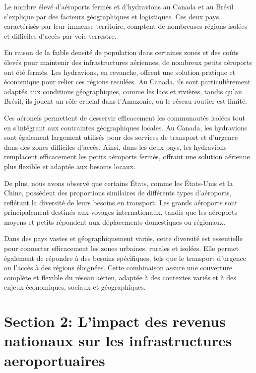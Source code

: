 \documentclass[
]{compterendu}
\begin{document}
Le nombre élevé d'aéroports fermés et d'hydravions au Canada et au
Brésil s'explique par des facteurs géographiques et logistiques. Ces
deux pays, caractérisés par leur immense territoire, comptent de
nombreuses régions isolées et difficiles d'accès par voie terrestre.

En raison de la faible densité de population dans certaines zones et des
coûts élevés pour maintenir des infrastructures aériennes, de nombreux
petits aéroports ont été fermés. Les hydravions, en revanche, offrent
une solution pratique et économique pour relier ces régions reculées. Au
Canada, ils sont particulièrement adaptés aux conditions géographiques,
comme les lacs et rivières, tandis qu'au Brésil, ils jouent un rôle
crucial dans l'Amazonie, où le réseau routier est limité.

Ces aéronefs permettent de desservir efficacement les communautés
isolées tout en s'intégrant aux contraintes géographiques locales. Au
Canada, les hydravions sont également largement utilisés pour des
services de transport et d'urgence dans des zones difficiles d'accès.
Ainsi, dans les deux pays, les hydravions remplacent efficacement les
petits aéroports fermés, offrant une solution aérienne plus flexible et
adaptée aux besoins locaux.

De plus, nous avons observé que certains États, comme les États-Unis et
la Chine, possèdent des proportions similaires de différents types
d'aéroports, reflétant la diversité de leurs besoins en transport. Les
grands aéroports sont principalement destinés aux voyages
internationaux, tandis que les aéroports moyens et petits répondent aux
déplacements domestiques ou régionaux.

Dans des pays vastes et géographiquement variés, cette diversité est
essentielle pour connecter efficacement les zones urbaines, rurales et
isolées. Elle permet également de répondre à des besoins spécifiques,
tels que le transport d'urgence ou l'accès à des régions éloignées.
Cette combinaison assure une couverture complète et flexible du réseau
aérien, adaptée à des contextes variés et à des enjeux économiques,
sociaux et géographiques.

\section{\texorpdfstring{\textbf{Section 2: L'impact des revenus
nationaux sur les infrastructures
aeroportuaires}}{Section 2: L'impact des revenus nationaux sur les infrastructures aeroportuaires}}\label{section-2-limpact-des-revenus-nationaux-sur-les-infrastructures-aeroportuaires}
\end{document}
